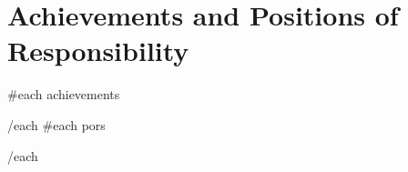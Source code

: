 \section{Achievements and Positions of Responsibility}
    \resumeSubHeadingListStart
        {{#each achievements}}

        {{/each}}
        {{#each pors}}

        {{/each}}
            
        
    \resumeSubHeadingListEnd